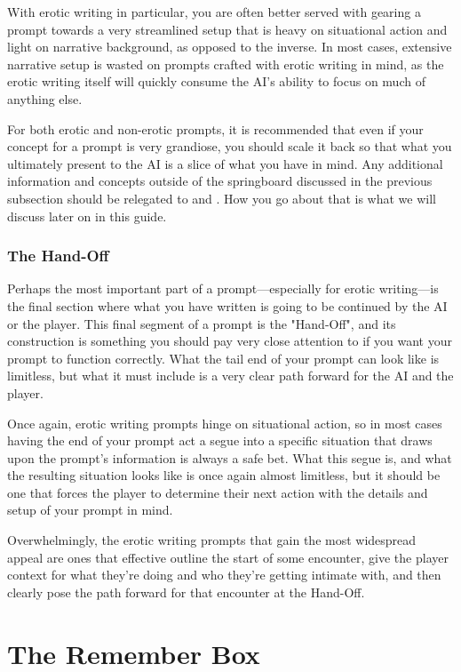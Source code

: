 ﻿\documentclass[Coomer-main.tex]{subfiles}
\begin{document}
With erotic writing in particular, you are often better served with gearing a prompt towards a very streamlined setup that is heavy on situational action and light on narrative background, as opposed to the inverse.
In most cases, extensive narrative setup is wasted on prompts crafted with erotic writing in mind, as the erotic writing itself will quickly consume the AI's ability to focus on much of anything else.

For both erotic and non-erotic prompts, it is recommended that even if your concept for a prompt is very grandiose, you should scale it back so that what you ultimately present to the AI is a slice of what you have in mind.
Any additional information and concepts outside of the springboard discussed in the previous subsection should be relegated to \rem and \wi.
How you go about that is what we will discuss later on in this guide.

\subsection{The Hand-Off}

Perhaps the most important part of a prompt—especially for erotic writing—is the final section where what you have written is going to be continued by the AI or the player.
This final segment of a prompt is the "Hand-Off", and its construction is something you should pay very close attention to if you want your prompt to function correctly.
What the tail end of your prompt can look like is limitless, but what it must include is a very clear path forward for the AI and the player.

Once again, erotic writing prompts hinge on situational action, so in most cases having the end of your prompt act a segue into a specific situation that draws upon the prompt's information is always a safe bet.
What this segue is, and what the resulting situation looks like is once again almost limitless, but it should be one that forces the player to determine their next action with the details and setup of your prompt in mind.

Overwhelmingly, the erotic writing prompts that gain the most widespread appeal are ones that effective outline the start of some encounter, give the player context for what they're doing and who they're getting intimate with, and then clearly pose the path forward for that encounter at the Hand-Off.

\chapter{The Remember Box}
\label{ch:remember}
\end{document}
